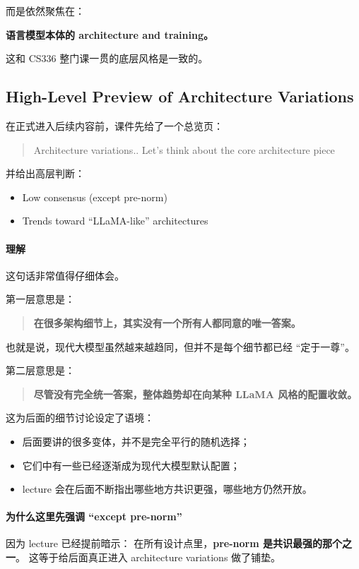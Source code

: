 \documentclass[a4paper,UTF8]{article}
\numberwithin{equation}{section}
\begin{document}
而是依然聚焦在：
\begin{center}
\textbf{语言模型本体的 architecture and training。}
\end{center}

这和 CS336 整门课一贯的底层风格是一致的。

\subsection{High-Level Preview of Architecture Variations}

在正式进入后续内容前，课件先给了一个总览页：
\begin{quote}
Architecture variations..
Let’s think about the core architecture piece
\end{quote}

并给出高层判断：
\begin{itemize}
    \item Low consensus (except pre-norm)
    \item Trends toward ``LLaMA-like'' architectures
\end{itemize}

\paragraph{理解}
这句话非常值得仔细体会。

第一层意思是：

\begin{quote}
\textbf{在很多架构细节上，其实没有一个所有人都同意的唯一答案。}
\end{quote}

也就是说，现代大模型虽然越来越趋同，但并不是每个细节都已经 ``定于一尊''。

第二层意思是：

\begin{quote}
\textbf{尽管没有完全统一答案，整体趋势却在向某种 LLaMA 风格的配置收敛。}
\end{quote}

这为后面的细节讨论设定了语境：
\begin{itemize}
    \item 后面要讲的很多变体，并不是完全平行的随机选择；
    \item 它们中有一些已经逐渐成为现代大模型默认配置；
    \item lecture 会在后面不断指出哪些地方共识更强，哪些地方仍然开放。
\end{itemize}

\paragraph{为什么这里先强调 ``except pre-norm''}
因为 lecture 已经提前暗示：  
在所有设计点里，\textbf{pre-norm 是共识最强的那个之一}。  
这等于给后面真正进入 architecture variations 做了铺垫。
\end{document}
